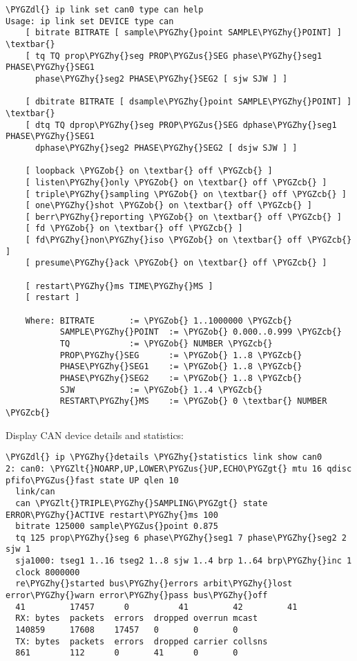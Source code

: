 \documentclass[a4paper,8pt,english]{sphinxmanual}
\def\PYGZus{\char`\_}
\def\PYGZob{\char`\{}
\def\PYGZcb{\char`\}}
\def\PYGZlt{\char`\<}
\def\PYGZgt{\char`\>}
\def\PYGZdl{\char`\$}
\def\PYGZhy{\char`\-}
\begin{document}
\begin{Verbatim}[commandchars=\\\{\}]
\PYGZdl{} ip link set can0 type can help
Usage: ip link set DEVICE type can
    [ bitrate BITRATE [ sample\PYGZhy{}point SAMPLE\PYGZhy{}POINT] ] \textbar{}
    [ tq TQ prop\PYGZhy{}seg PROP\PYGZus{}SEG phase\PYGZhy{}seg1 PHASE\PYGZhy{}SEG1
      phase\PYGZhy{}seg2 PHASE\PYGZhy{}SEG2 [ sjw SJW ] ]

    [ dbitrate BITRATE [ dsample\PYGZhy{}point SAMPLE\PYGZhy{}POINT] ] \textbar{}
    [ dtq TQ dprop\PYGZhy{}seg PROP\PYGZus{}SEG dphase\PYGZhy{}seg1 PHASE\PYGZhy{}SEG1
      dphase\PYGZhy{}seg2 PHASE\PYGZhy{}SEG2 [ dsjw SJW ] ]

    [ loopback \PYGZob{} on \textbar{} off \PYGZcb{} ]
    [ listen\PYGZhy{}only \PYGZob{} on \textbar{} off \PYGZcb{} ]
    [ triple\PYGZhy{}sampling \PYGZob{} on \textbar{} off \PYGZcb{} ]
    [ one\PYGZhy{}shot \PYGZob{} on \textbar{} off \PYGZcb{} ]
    [ berr\PYGZhy{}reporting \PYGZob{} on \textbar{} off \PYGZcb{} ]
    [ fd \PYGZob{} on \textbar{} off \PYGZcb{} ]
    [ fd\PYGZhy{}non\PYGZhy{}iso \PYGZob{} on \textbar{} off \PYGZcb{} ]
    [ presume\PYGZhy{}ack \PYGZob{} on \textbar{} off \PYGZcb{} ]

    [ restart\PYGZhy{}ms TIME\PYGZhy{}MS ]
    [ restart ]

    Where: BITRATE       := \PYGZob{} 1..1000000 \PYGZcb{}
           SAMPLE\PYGZhy{}POINT  := \PYGZob{} 0.000..0.999 \PYGZcb{}
           TQ            := \PYGZob{} NUMBER \PYGZcb{}
           PROP\PYGZhy{}SEG      := \PYGZob{} 1..8 \PYGZcb{}
           PHASE\PYGZhy{}SEG1    := \PYGZob{} 1..8 \PYGZcb{}
           PHASE\PYGZhy{}SEG2    := \PYGZob{} 1..8 \PYGZcb{}
           SJW           := \PYGZob{} 1..4 \PYGZcb{}
           RESTART\PYGZhy{}MS    := \PYGZob{} 0 \textbar{} NUMBER \PYGZcb{}
\end{Verbatim}

Display CAN device details and statistics:

\begin{Verbatim}[commandchars=\\\{\}]
\PYGZdl{} ip \PYGZhy{}details \PYGZhy{}statistics link show can0
2: can0: \PYGZlt{}NOARP,UP,LOWER\PYGZus{}UP,ECHO\PYGZgt{} mtu 16 qdisc pfifo\PYGZus{}fast state UP qlen 10
  link/can
  can \PYGZlt{}TRIPLE\PYGZhy{}SAMPLING\PYGZgt{} state ERROR\PYGZhy{}ACTIVE restart\PYGZhy{}ms 100
  bitrate 125000 sample\PYGZus{}point 0.875
  tq 125 prop\PYGZhy{}seg 6 phase\PYGZhy{}seg1 7 phase\PYGZhy{}seg2 2 sjw 1
  sja1000: tseg1 1..16 tseg2 1..8 sjw 1..4 brp 1..64 brp\PYGZhy{}inc 1
  clock 8000000
  re\PYGZhy{}started bus\PYGZhy{}errors arbit\PYGZhy{}lost error\PYGZhy{}warn error\PYGZhy{}pass bus\PYGZhy{}off
  41         17457      0          41         42         41
  RX: bytes  packets  errors  dropped overrun mcast
  140859     17608    17457   0       0       0
  TX: bytes  packets  errors  dropped carrier collsns
  861        112      0       41      0       0
\end{Verbatim}
\end{document}
